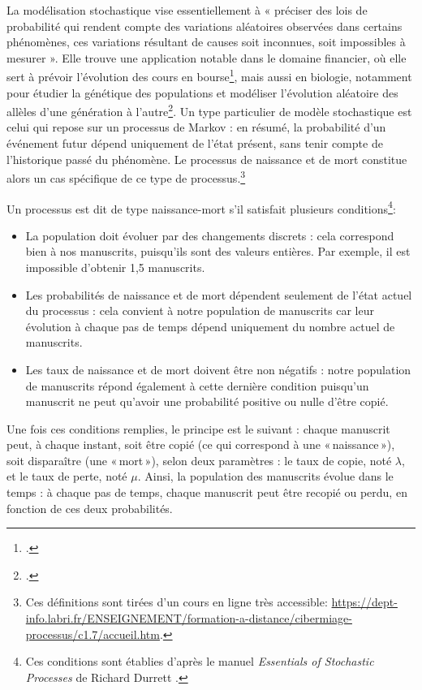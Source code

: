 \documentclass[a4paper,twoside,12pt]{book}
\begin{document}
La modélisation stochastique vise essentiellement à « préciser des lois de probabilité qui rendent compte des variations aléatoires observées dans certains phénomènes, ces variations résultant de causes soit inconnues, soit impossibles à mesurer ». Elle trouve une application notable dans le domaine financier, où elle sert à prévoir l’évolution des cours en bourse\footcite{Cunchala}, mais aussi en biologie, notamment pour étudier la génétique des populations et modéliser l’évolution aléatoire des allèles d’une génération à l’autre\footcite{Elowitz}. Un type particulier de modèle stochastique est celui qui repose sur un processus de Markov : en résumé, la probabilité d’un événement futur dépend uniquement de l’état présent, sans tenir compte de l’historique passé du phénomène. Le processus de naissance et de mort constitue alors un cas spécifique de ce type de processus.\footnote{Ces définitions sont tirées d’un cours en ligne très accessible: \url{https://dept-info.labri.fr/ENSEIGNEMENT/formation-a-distance/cibermiage-processus/c1.7/accueil.htm}.}


 Un processus est dit de type naissance-mort s’il satisfait plusieurs conditions\footnote{Ces conditions sont établies d’après le manuel \textit{Essentials of Stochastic Processes} de Richard Durrett \cite{durrett2016essentials}.}:

\begin{itemize}
	\item La population doit évoluer par des changements discrets : cela correspond bien à nos manuscrits, puisqu’ils sont des valeurs entières. Par exemple, il est impossible d’obtenir 1{,}5 manuscrits.
	\item Les probabilités de naissance et de mort dépendent seulement de l’état actuel du processus : cela convient à notre population de manuscrits car leur évolution à chaque pas de temps dépend uniquement du nombre actuel de manuscrits.
	\item Les taux de naissance et de mort doivent être non négatifs : notre population de manuscrits répond également à cette dernière condition puisqu'un manuscrit ne peut qu'avoir une probabilité positive ou nulle d'être copié.
\end{itemize}

Une fois ces conditions remplies, le principe est le suivant : chaque manuscrit peut, à chaque instant, soit être copié (ce qui correspond à une « naissance »), soit disparaître (une « mort »), selon deux paramètres : le taux de copie, noté $\lambda$, et le taux de perte, noté $\mu$. Ainsi, la population des manuscrits évolue dans le temps : à chaque pas de temps, chaque manuscrit peut être recopié ou perdu, en fonction de ces deux probabilités.
\end{document}
